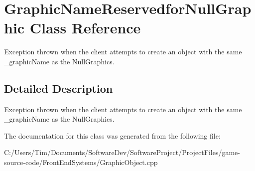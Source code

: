 \hypertarget{class_graphic_name_reservedfor_null_graphic}{}\section{Graphic\+Name\+Reservedfor\+Null\+Graphic Class Reference}
\label{class_graphic_name_reservedfor_null_graphic}


Exception thrown when the client attempts to create an object with the same \+\_\+graphic\+Name as the Null\+Graphics.  




\subsection{Detailed Description}
Exception thrown when the client attempts to create an object with the same \+\_\+graphic\+Name as the Null\+Graphics. 

The documentation for this class was generated from the following file\+:\begin{DoxyCompactItemize}
\item 
C\+:/\+Users/\+Tim/\+Documents/\+Software\+Dev/\+Software\+Project/\+Project\+Files/game-\/source-\/code/\+Front\+End\+Systems/Graphic\+Object.\+cpp\end{DoxyCompactItemize}
